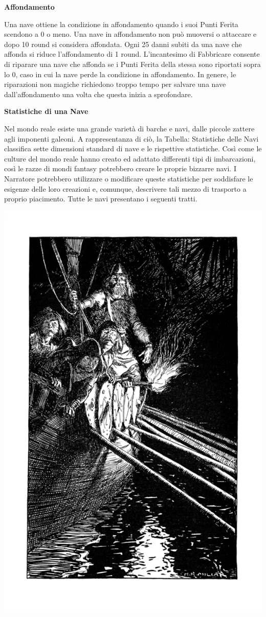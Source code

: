 \documentclass[a4paper,twoside,openany]{book}
\begin{document}
\begin{multicols}{2}
\textbf{Affondamento}

Una nave ottiene la condizione in affondamento quando i suoi Punti Ferita scendono a 0 o meno. Una nave in affondamento non può muoversi o attaccare e dopo 10 round si considera affondata. Ogni 25 danni subiti da una nave che affonda si riduce l'affondamento di 1 round. L'incantesimo di Fabbricare consente di riparare una nave che affonda se i Punti Ferita della stessa sono riportati sopra lo 0, caso in cui la nave perde la condizione in affondamento. In genere, le riparazioni non magiche richiedono troppo tempo per salvare una nave dall'affondamento una volta che questa inizia a sprofondare.

\textbf{Statistiche di una Nave}

Nel mondo reale esiste una grande varietà di barche e navi, dalle piccole zattere agli imponenti galeoni. A rappresentanza di ciò, la Tabella: Statistiche delle Navi classifica sette dimensioni standard di nave e le rispettive statistiche. Così come le culture del mondo reale hanno creato ed adattato differenti tipi di imbarcazioni, così le razze di mondi fantasy potrebbero creare le proprie bizzarre navi.
I Narratore potrebbero utilizzare o modificare queste statistiche per soddisfare le esigenze delle loro creazioni e, comunque, descrivere tali mezzo di trasporto a proprio piacimento. Tutte le navi presentano i seguenti tratti.


\begin{center}
\includegraphics[width=0.8\linewidth]{immagini/navenotte.png}
\end{center}


\end{multicols}
\end{document}
